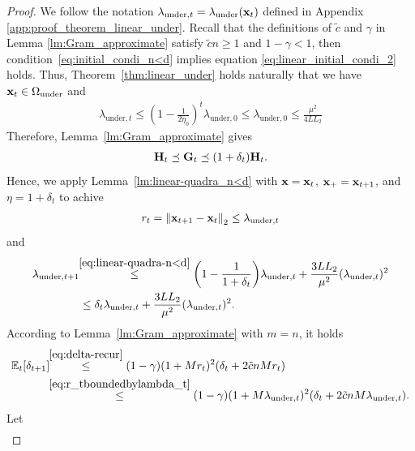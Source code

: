 \documentclass[11pt]{article}
\theoremstyle{plain}
\theoremstyle{definition}
\theoremstyle{remark}
\theoremstyle{plain}
\newcommand{\norm}[1]{\left\| #1 \right\|_2}
\def\vx{{\bf{x}}}
\def\vx {{{\bf x}}}
\def\G{{\bf G}}
\def\H{{\bf H}}
\def\x{{\bf x}}
\begin{document}
\begin{proof} 
We follow the notation $\lambda_{\mathrm{under},t}=\lambda_{\mathrm{under}}(\x_t)$ defined in Appendix
\ref{app:proof_theorem_linear_under}.
Recall that the definitions of $\tilde c$ and $\gamma$ in Lemma \ref{lm:Gram_approximate} satisfy
 $\tilde c n\geq1$ and $1-\gamma<1$, then
 condition~\eqref{eq:initial_condi_n<d} implies equation \eqref{eq:linear_initial_condi_2} holds.
Thus, Theorem~\ref{thm:linear_under} holds naturally that we have $\x_t\in\Omega_{\mathrm{under}}$ and
\begin{align}
\label{eq:thm_linear_condi_imply}
    \lambda_{\mathrm{under},t}\leq \left(1-\frac{1}{2\eta_0}\right)^{t}\lambda_{\mathrm{under},0}\leq \lambda_{\mathrm{under},0}\leq \frac{\mu^2}{4LL_2}
\end{align}
Therefore, Lemma~\ref{lm:Gram_approximate} gives
\begin{align}\label{eq:HGdelta}
    \H_t\preceq \G_t\preceq (1+\delta_t)\H_t.
\end{align}
Hence, we apply Lemma~\ref{lm:linear-quadra_n<d} with $\vx = \vx_t$, $\vx_+=\vx_{t+1}$, and $\eta=1+\delta_t$ to achive
\begin{align}
    \label{eq:r_tboundedbylambda_t}
r_t=\norm{\vx_{t+1}-\vx_t}\leq\lambda_{\mathrm{under},t}
\end{align}
and
\begin{align}
\label{eq:exp_lambda_n<d}
\lambda_{\mathrm{under},t+1}
&\!\!\overset{\eqref{eq:linear-quadra-n<d}}{\leq}
\biggl(1-\frac{1}{1+\delta_t}\biggr)\lambda_{\mathrm{under},t}
+\frac{3LL_2}{\mu^2}(\lambda_{\mathrm{under},t})^2\notag\\
& \leq\delta_t\lambda_{\mathrm{under},t}
+\frac{3LL_2}{\mu^2}(\lambda_{\mathrm{under},t})^2.
\end{align}
According to Lemma~\ref{lm:Gram_approximate} with $m=n$, it holds
\begin{align}
\label{eq:exp_delta_n<d}
\begin{split}    
\mathbb E_t[\delta_{t+1}]
&\!\!\overset{\eqref{eq:delta-recur}}{\leq}
(1-\gamma)(1+Mr_t)^2(\delta_t+2\tilde c nMr_t) \\
&\!\!\overset{\eqref{eq:r_tboundedbylambda_t}}{\leq}
(1-\gamma)(1+M\lambda_{\mathrm{under},t})^2
 (\delta_t+2\tilde c nM\lambda_{\mathrm{under},t}).
 \end{split}
\end{align}
Let
\begin{align}\label{eq:dfn-xi-t}

\end{align}
\end{proof}
\end{document}
